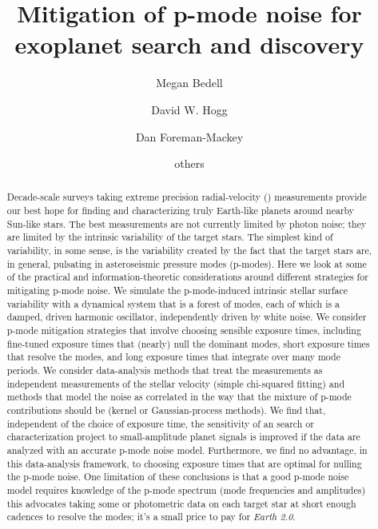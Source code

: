 \documentclass[modern]{aastex62}
\begin{document}
\sloppy\sloppypar\raggedbottom\frenchspacing %

\title{\textbf{%
Mitigation of p-mode noise for exoplanet search and discovery
}}

\author[0000-0001-9907-7742]{Megan Bedell}
\affiliation{\flatiron}

\author[0000-0003-2866-9403]{David W. Hogg}
\affiliation{\flatiron}
\affiliation{\nyuccpp}
\affiliation{\nyucds}
\affiliation{\mpia}

\author[0000-0002-9328-5652]{Dan Foreman-Mackey}
\affiliation{\flatiron}

\author{others}


\begin{abstract}\noindent
Decade-scale surveys taking extreme precision radial-velocity (\EPRV)
measurements provide our best hope for finding and characterizing
truly Earth-like planets around nearby Sun-like stars.
The best \EPRV measurements are not currently limited by photon noise;
they are limited by the intrinsic variability of the target stars.
The simplest kind of variability, in some sense, is the variability
created by the fact that the target stars are, in general, pulsating
in asteroseismic pressure modes (p-modes).
Here we look at some of the practical and information-theoretic
considerations around different strategies for mitigating p-mode
noise.
We simulate the p-mode-induced intrinsic stellar surface variability
with a dynamical system that is a forest of modes, each of which is a
damped, driven harmonic oscillator, independently driven by white noise.
We consider p-mode mitigation strategies that involve choosing
sensible exposure times, including fine-tuned exposure times that
(nearly) null the dominant modes, short exposure times that resolve
the modes, and long exposure times that integrate over many mode
periods.
We consider data-analysis methods that treat the measurements as
independent measurements of the stellar velocity (simple chi-squared
fitting) and methods that model the noise as correlated in the way
that the mixture of p-mode contributions should be (kernel or
Gaussian-process methods).
We find that, independent of the choice of exposure time, the
sensitivity of an \EPRV search or characterization project to
small-amplitude planet signals is improved if the data are analyzed
with an accurate p-mode noise model.
Furthermore, we find no advantage, in this data-analysis framework, to
choosing exposure times that are optimal for nulling the p-mode noise.
One limitation of these conclusions is that a good p-mode noise model
requires knowledge of the p-mode spectrum (mode frequencies and
amplitudes) this advocates taking some \EPRV or photometric data on
each target star at short enough cadences to resolve the modes; it's
a small price to pay for \emph{Earth 2.0}.
\end{abstract}
\end{document}
